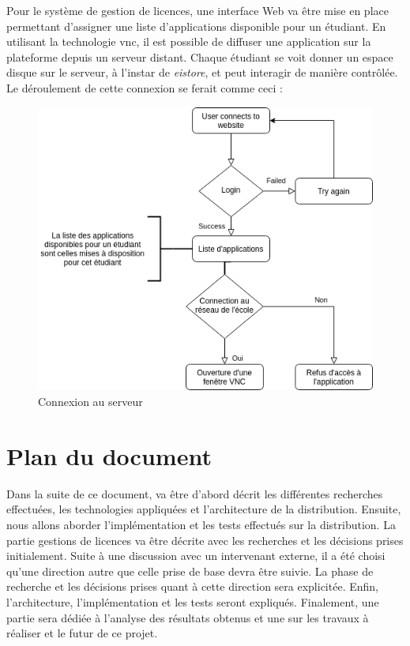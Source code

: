 Pour le système de gestion de licences, une interface Web va être mise en place permettant d'assigner une liste d'applications disponible pour un étudiant.
En utilisant la technologie \acrshort{vnc}, il est possible de diffuser une application sur la plateforme depuis un serveur distant.
Chaque étudiant se voit donner un espace disque sur le serveur, à l'instar de \textit{eistore}, et peut interagir de manière contrôlée.
Le déroulement de cette connexion se ferait comme ceci :
\begin{figure}
    \centering
    \includegraphics[scale=0.5]{images/VNC_use_case.png}
    \caption{Connexion au serveur}
    \label{fig:global_arch}
\end{figure}

\section{Plan du document}
Dans la suite de ce document, va être d'abord décrit les différentes recherches effectuées, les technologies appliquées et l'architecture de la distribution. 
Ensuite, nous allons aborder l'implémentation et les tests effectués sur la distribution.
La partie gestions de licences va être décrite avec les recherches et les décisions prises initialement.
Suite à une discussion avec un intervenant externe, il a été choisi qu'une direction autre que celle prise de base devra être suivie.
La phase de recherche et les décisions prises quant à cette direction sera explicitée.
Enfin, l'architecture, l'implémentation et les tests seront expliqués.
Finalement, une partie sera dédiée à l'analyse des résultats obtenus et une sur les travaux à réaliser et le futur de ce projet.



